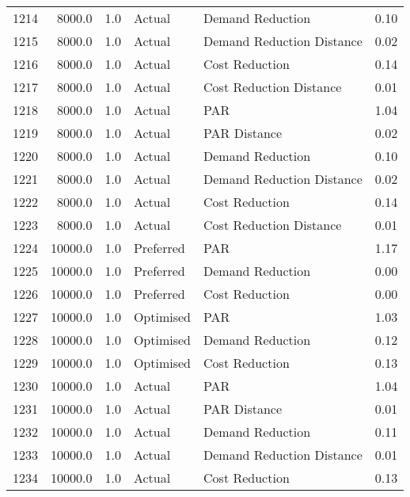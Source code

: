 \begin{longtable}{lrrllr}
1214 &       8000.0 &     1.0 &         Actual &           Demand Reduction &   0.10 \\
1215 &       8000.0 &     1.0 &         Actual &  Demand Reduction Distance &   0.02 \\
1216 &       8000.0 &     1.0 &         Actual &             Cost Reduction &   0.14 \\
1217 &       8000.0 &     1.0 &         Actual &    Cost Reduction Distance &   0.01 \\
1218 &       8000.0 &     1.0 &         Actual &                        PAR &   1.04 \\
1219 &       8000.0 &     1.0 &         Actual &               PAR Distance &   0.02 \\
1220 &       8000.0 &     1.0 &         Actual &           Demand Reduction &   0.10 \\
1221 &       8000.0 &     1.0 &         Actual &  Demand Reduction Distance &   0.02 \\
1222 &       8000.0 &     1.0 &         Actual &             Cost Reduction &   0.14 \\
1223 &       8000.0 &     1.0 &         Actual &    Cost Reduction Distance &   0.01 \\
1224 &      10000.0 &     1.0 &      Preferred &                        PAR &   1.17 \\
1225 &      10000.0 &     1.0 &      Preferred &           Demand Reduction &   0.00 \\
1226 &      10000.0 &     1.0 &      Preferred &             Cost Reduction &   0.00 \\
1227 &      10000.0 &     1.0 &      Optimised &                        PAR &   1.03 \\
1228 &      10000.0 &     1.0 &      Optimised &           Demand Reduction &   0.12 \\
1229 &      10000.0 &     1.0 &      Optimised &             Cost Reduction &   0.13 \\
1230 &      10000.0 &     1.0 &         Actual &                        PAR &   1.04 \\
1231 &      10000.0 &     1.0 &         Actual &               PAR Distance &   0.01 \\
1232 &      10000.0 &     1.0 &         Actual &           Demand Reduction &   0.11 \\
1233 &      10000.0 &     1.0 &         Actual &  Demand Reduction Distance &   0.01 \\
1234 &      10000.0 &     1.0 &         Actual &             Cost Reduction &   0.13 \\

\end{longtable}

